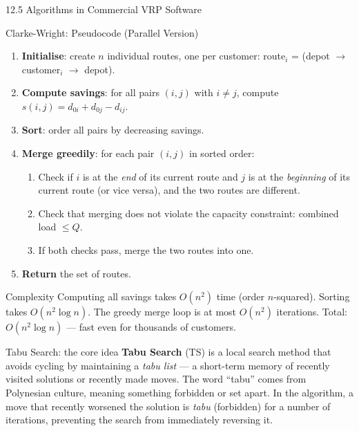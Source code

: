 \documentclass[aspectratio=169,10pt]{beamer}
\begin{document}
\begin{frame}[allowframebreaks]{12.5 \; Algorithms in Commercial VRP Software}
  \begin{block}{Clarke-Wright: Pseudocode (Parallel Version)}
    \begin{enumerate}
      \item \textbf{Initialise}: create $n$ individual routes, one per customer:
            route$_i$ = (depot $\to$ customer$_i$ $\to$ depot).
      \item \textbf{Compute savings}: for all pairs $(i,j)$ with $i \neq j$,
            compute $s(i,j) = d_{0i} + d_{0j} - d_{ij}$.
      \item \textbf{Sort}: order all pairs by decreasing savings.
      \item \textbf{Merge greedily}: for each pair $(i,j)$ in sorted order:
        \begin{enumerate}
          \item[(4a)] Check if $i$ is at the \emph{end} of its current route
                     and $j$ is at the \emph{beginning} of its current route
                     (or vice versa), and the two routes are different.
          \item[(4b)] Check that merging does not violate the capacity constraint:
                     combined load $\leq Q$.
          \item[(4c)] If both checks pass, merge the two routes into one.
        \end{enumerate}
      \item \textbf{Return} the set of routes.
    \end{enumerate}
  \end{block}

  \begin{alertblock}{Complexity}
    Computing all savings takes $O(n^2)$ time (order $n$-squared).
    Sorting takes $O(n^2 \log n)$.
    The greedy merge loop is at most $O(n^2)$ iterations.
    Total: $O(n^2 \log n)$ --- fast even for thousands of customers.
  \end{alertblock}

  \framebreak

  \begin{block}{Tabu Search: the core idea}
    \textbf{Tabu Search} (TS) is a local search method that avoids cycling
    by maintaining a \emph{tabu list} --- a short-term memory of recently
    visited solutions or recently made moves.
    The word ``tabu'' comes from Polynesian culture, meaning something
    forbidden or set apart.
    In the algorithm, a move that recently worsened the solution is
    \emph{tabu} (forbidden) for a number of iterations, preventing the
    search from immediately reversing it.


\end{block}
\end{frame}
\end{document}
